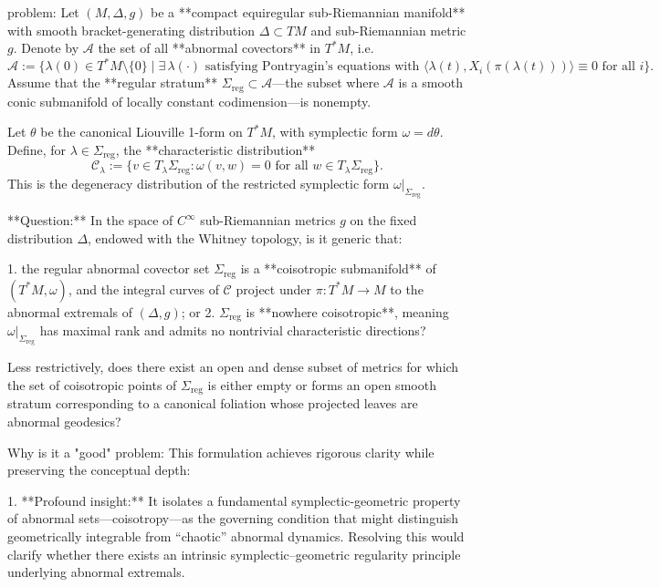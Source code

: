 problem:  
Let \((M,\Delta,g)\) be a **compact equiregular sub-Riemannian manifold** with smooth bracket-generating distribution \(\Delta \subset TM\) and sub-Riemannian metric \(g\).  
Denote by \(\mathcal{A}\) the set of all **abnormal covectors** in \(T^*M\), i.e.
\[
\mathcal{A} := \{\lambda(0) \in T^*M\setminus\{0\} \mid \exists\, \lambda(\cdot) \text{ satisfying Pontryagin’s equations with } \langle \lambda(t), X_i(\pi(\lambda(t)))\rangle \equiv 0 \text{ for all } i\}.
\]
Assume that the **regular stratum** \(\Sigma_{\mathrm{reg}}\subset \mathcal{A}\)—the subset where \(\mathcal{A}\) is a smooth conic submanifold of locally constant codimension—is nonempty.  

Let \(\theta\) be the canonical Liouville 1-form on \(T^*M\), with symplectic form \(\omega=d\theta\).  
Define, for \(\lambda\in\Sigma_{\mathrm{reg}}\), the **characteristic distribution**
\[
\mathcal{C}_\lambda := \{v\in T_\lambda\Sigma_{\mathrm{reg}} : \omega(v,w)=0 \text{ for all } w\in T_\lambda\Sigma_{\mathrm{reg}}\}.
\]
This is the degeneracy distribution of the restricted symplectic form \(\omega|_{\Sigma_{\mathrm{reg}}}\).

**Question:**  
In the space of \(C^\infty\) sub-Riemannian metrics \(g\) on the fixed distribution \(\Delta\), endowed with the Whitney topology, is it generic that:

1. the regular abnormal covector set \(\Sigma_{\mathrm{reg}}\) is a **coisotropic submanifold** of \((T^*M,\omega)\), and the integral curves of \(\mathcal{C}\) project under \(\pi:T^*M\to M\) to the abnormal extremals of \((\Delta,g)\);  
or  
2. \(\Sigma_{\mathrm{reg}}\) is **nowhere coisotropic**, meaning \(\omega|_{\Sigma_{\mathrm{reg}}}\) has maximal rank and admits no nontrivial characteristic directions?  

Less restrictively, does there exist an open and dense subset of metrics for which the set of coisotropic points of \(\Sigma_{\mathrm{reg}}\) is either empty or forms an open smooth stratum corresponding to a canonical foliation whose projected leaves are abnormal geodesics?

Why is it a "good" problem:  
This formulation achieves rigorous clarity while preserving the conceptual depth:  

1. **Profound insight:**  
   It isolates a fundamental symplectic-geometric property of abnormal sets—coisotropy—as the governing condition that might distinguish geometrically integrable from “chaotic” abnormal dynamics. Resolving this would clarify whether there exists an intrinsic symplectic–geometric regularity principle underlying abnormal extremals.  

